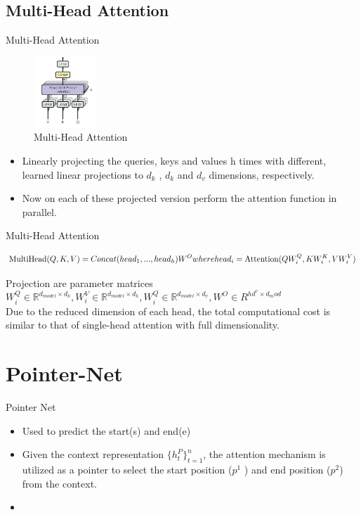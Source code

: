 \documentclass[10pt]{beamer}
\newcommand{\et}[1]{\textit{#1}}
\begin{document}
\subsection{Multi-Head Attention}

\begin{frame}{Multi-Head Attention}
	\begin{figure}[ht!]
		\centering
		\includegraphics[height=100px]{includes/Attention-Multi.png}
		\caption{Multi-Head Attention \et{\citep[Source:][]{--Attention is all you need}}}
		\label{fig:multi-attention}
	\end{figure}
	\vspace{-20}
	\begin{itemize}
		\item Linearly projecting the queries, keys and values h times with different, learned linear projections to $d_k$ , $d_k$ and $d_v$ dimensions, respectively.
		\item Now on each of these projected version perform the attention function in parallel.
	\end{itemize}
\end{frame}

\begin{frame}{Multi-Head Attention}
	\begin{center}
		\[
			\text {MultiHead}(Q, K, V) = Concat(head_1, ...,head_h)W^O\\
			where head_i = \text{Attention}(QW_i^Q, KW_i^K,VW_i^V)
		\]
	\end{center}
	Projection are parameter matrices $W_i^Q \in \mathbb{R}^{d_{model} \times d_k}, W_i^V \in \mathbb{R}^{d_{model}\times d_k}, W_i^Q \in \mathbb{R}^{d_{model} \times d_v}, W^O \in R^{{hd^v} \times d_mod}  $\\
	Due to the reduced dimension of each head, the total computational cost is similar to that of single-head attention with full dimensionality.
\end{frame}
\section{Pointer-Net}
\begin{frame}{Pointer Net}
	\begin{itemize}
		\item Used to predict the start(s) and end(e)
		\item Given the context representation $\{h_t^P\}_{t = 1}^n$, the attention mechanism is utilized as a pointer to select the start position ($p^1$ ) and end position ($p^2 $) from the context.
		\item
	\end{itemize}

\end{frame}
\end{document}
